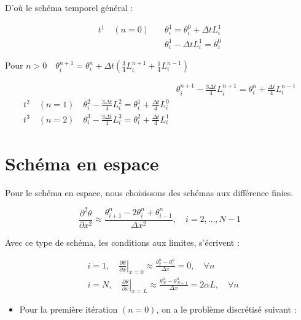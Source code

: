 \documentclass[10pt]{article}
\begin{document}
D'où le schéma temporel général :

\[
\begin{aligned}
t^{1} \quad(n=0) \quad & \theta_{i}^{1}=\theta_{i}^{0}+\Delta t L_{i}^{1} \\
& \theta_{i}^{1}-\Delta t L_{i}^{1}=\theta_{i}^{0}
\end{aligned}
\]

Pour \(n>0 \quad \theta_{i}^{n+1}=\theta_{i}^{n}+\Delta t\left(\frac{3}{4} L_{i}^{n+1}+\frac{1}{4} L_{i}^{n-1}\right)\)

\[
\begin{array}{ll} 
& \theta_{i}^{n+1}-\frac{3 \Delta t}{4} L_{i}^{n+1}=\theta_{i}^{n}+\frac{\Delta t}{4} L_{i}^{n-1} \\
t^{2} \quad(n=1) \quad \theta_{i}^{2}-\frac{3 \Delta t}{4} L_{i}^{2}=\theta_{i}^{1}+\frac{\Delta t}{4} L_{i}^{0} \\
t^{3} \quad(n=2) \quad \theta_{i}^{3}-\frac{3 \Delta t}{4} L_{i}^{3}=\theta_{i}^{2}+\frac{\Delta t}{4} L_{i}^{1}
\end{array}
\]

\section*{Schéma en espace}
Pour le schéma en espace, nous choisissons des schémas aux différence finies.

\[
\frac{\partial^{2} \theta}{\partial x^{2}} \approx \frac{\theta_{i+1}^{n}-2 \theta_{i}^{n}+\theta_{i-1}^{n}}{\Delta x^{2}}, \quad i=2, \ldots, N-1
\]

Avec ce type de schéma, les conditions aux limites, s'écrivent :

\[
\begin{aligned}
& i=1,\left.\quad \frac{\partial \theta}{\partial x}\right|_{x=0} \approx \frac{\theta_{2}^{n}-\theta_{1}^{n}}{\Delta x}=0, \quad \forall n \\
& i=N,\left.\quad \frac{\partial \theta}{\partial x}\right|_{x=L} \approx \frac{\theta_{N}^{n}-\theta_{N-1}^{n}}{\Delta x}=2 \alpha L, \quad \forall n
\end{aligned}
\]

\begin{itemize}
  \item Pour la première itération \((n=0)\), on a le problème discrétisé suivant :
\end{itemize}
\end{document}
